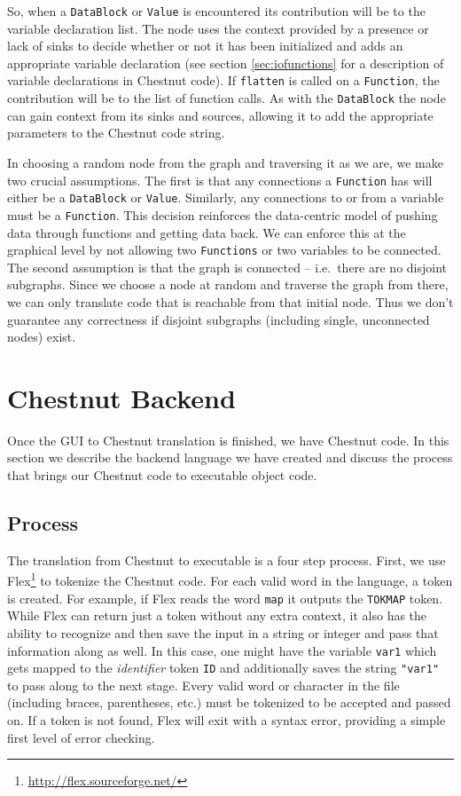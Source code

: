 \documentclass[twocolumn]{article}
\renewcommand{\|}{\origbar} %
\newcommand{\code}[1]{\texttt{#1}}
\begin{document}
So, when a \code{DataBlock} or \code{Value} is encountered its contribution will be to the variable declaration list. The node uses the context provided by a presence or lack of sinks to decide whether or not it has been initialized and adds an appropriate variable declaration (see section \ref{sec:iofunctions} for a description of variable declarations in Chestnut code). If \code{flatten} is called on a \code{Function}, the contribution will be to the list of function calls. As with the \code{DataBlock} the node can gain context from its sinks and sources, allowing it to add the appropriate parameters to the Chestnut code string.

In choosing a random node from the graph and traversing it as we are, we make two crucial assumptions. The first is that any connections a \code{Function} has will either be a \code{DataBlock} or \code{Value}. Similarly, any connections to or from a variable must be a \code{Function}. This decision reinforces the data-centric model of pushing data through functions and getting data back. We can enforce this at the graphical level by not allowing two \code{Functions} or two variables to be connected. The second assumption is that the graph is connected -- i.e.\ there are no disjoint subgraphs. Since we choose a node at random and traverse the graph from there, we can only translate code that is reachable from that initial node. Thus we don't guarantee any correctness if disjoint subgraphs (including single, unconnected nodes) exist.

\section{Chestnut Backend}
\label{sec:chestnutBackend}

Once the GUI to Chestnut translation is finished, we have Chestnut code. In this section we describe the backend language we have created and discuss the process that brings our Chestnut code to executable object code.

\subsection{Process}

The translation from Chestnut to executable is a four step process. First, we use Flex\footnote{\url{http://flex.sourceforge.net/}} to tokenize the Chestnut code. For each valid word in the language, a token is created. For example, if Flex reads the word \code{map} it outputs the \code{TOKMAP} token. While Flex can return just a token without any extra context, it also has the ability to recognize and then save the input in a string or integer and pass that information along as well. In this case, one might have the variable \code{var1} which gets mapped to the {\em identifier} token \code{ID} and additionally saves the string \code{"var1"} to pass along to the next stage. Every valid word or character in the file (including braces, parentheses, etc.) must be tokenized to be accepted and passed on. If a token is not found, Flex will exit with a syntax error, providing a simple first level of error checking. 
\end{document}
